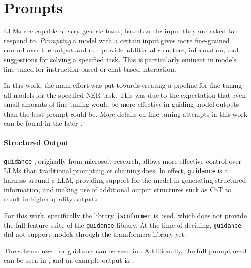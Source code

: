 


\section{Prompts}\label{sec:prompts}
\glspl{LLM} are capable of very generic tasks, based on the input they are asked to respond to.
\textit{Prompting} a model with a certain input gives more fine-grained control over the output and can provide additional structure, information, and suggestions for solving a specified task.
This is particularly eminent in models fine-tuned for instruction-based or chat-based interaction.

In this work, the main effort was put towards creating a pipeline for fine-tuning all models for the specified \gls{NER} task.
This was due to the expectation that even small amounts of fine-tuning would be more effective in guiding model outputs than the best prompt could be.
More details on fine-tuning attempts in this work can be found in the later .

\paragraph{Structured Output}
\texttt{guidance} \cite{guidance_2023}, originally from \gls{microsoft} research, allows more effective control over \glspl{LLM} than traditional prompting or chaining does.
In effect, \texttt{guidance} is a harness around a \gls{LLM}, providing support for the model in generating structured information, and making use of additional output structures such as CoT \cite{wei_chainofthought_2022} to result in higher-quality outputs.

For this work, specifically the library \texttt{jsonformer} \cite{1rgs_2023} is used, which does not provide the full feature suite of the \texttt{guidance} library.
At the time of deciding, \texttt{guidance} did not support models through the \gls{transformers} library yet.

The schema used for guidance can be seen in .
Additionally, the full prompt used can be seen in , and an example output in .



